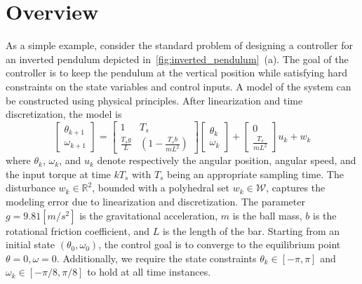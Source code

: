 \section{Overview}
\label{sec:example}


As a simple example, consider the standard problem of designing a controller for an inverted pendulum depicted in~\autoref{fig:inverted_pendulum}~{(a)}.
The goal of the controller is to keep the pendulum at the vertical position while satisfying hard constraints on the state variables and control inputs.
A model of the system can be constructed using physical principles. 
After linearization and time discretization, the model is
	\begin{equation}
		\begin{bmatrix}
			 \theta_{k+1}\\
			\omega_{k+1}
		\end{bmatrix}=
		\begin{bmatrix}
			1 & T_s\\
			\frac{T_sg}{L}& (1-\frac{T_sb}{mL^2})		
		\end{bmatrix}
		\begin{bmatrix}
			\theta_k\\
			\omega_k
		\end{bmatrix}+
		\begin{bmatrix}
			0\\
			\frac{T_s}{mL^2}
		\end{bmatrix}u_k + w_k
		\label{eq:pendul_ss}
	\end{equation}
where $\theta_k$, $\omega_k$, and $u_k$ denote respectively the angular position, angular speed, 
and the input torque at time $kT_s$ with $T_s$ being an appropriate sampling time.
The disturbance $w_k\in\mathbb R^2$, bounded with a polyhedral set $w_k\in \mathcal W$, captures the modeling error due to 
linearization and discretization. 
The parameter $g=9.81 [m/s^2]$ is the gravitational acceleration, $m$ is the ball mass, $b$ is the rotational friction coefficient, 
and $L$ is the length of the bar. 
Starting from an initial state $(\theta_0,\omega_0)$, the control goal is to converge to the equilibrium point 
$\theta=0, \omega=0$.
Additionally, we require the state constraints $\theta_k\in[-\pi,\pi]$ and $\omega_k\in[-\pi/8,\pi/8]$ to hold at all time instances.


